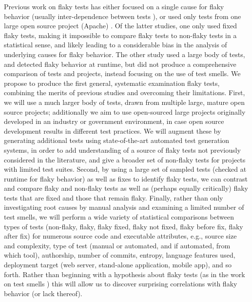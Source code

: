 \documentclass[10pt]{article}
\begin{document}
 Previous work on flaky tests has either focused on a single cause for flaky behavior (usually inter-dependence between tests \cite{LamZE2015}), or used only tests from one large open source project (Apache) \cite{luo2014empirical,palomba2017does}.  Of the latter studies, one \cite{luo2014empirical} only used fixed flaky tests, making it impossible to compare flaky tests to non-flaky tests in a statistical sense, and likely leading to a considerable bias in the analysis of underlying causes for flaky behavior.  The other study \cite{palomba2017does} used a large body of tests, and detected flaky behavior at runtime, but did not produce a comprehensive comparison of tests and projects, instead focusing on the use of test smells.  We propose to produce the first general, systematic examination flaky tests, combining the merits of previous studies and overcoming their limitations.  First, we will use a much larger body of tests, drawn from multiple large, mature open source projects; additionally we aim to use open-sourced large projects originally developed in an industry or government environment, in case open source development results in different test practices.  We will augment these by generating additional tests using state-of-the-art automated test generation systems, in order to add understanding of a source of flaky tests not previously considered in the literature, and give a broader set of non-flaky tests for projects with limited test suites.  Second, by using a large set of sampled tests (checked at runtime for flaky behavior) as well as fixes to identify flaky tests, we can contrast and compare flaky and non-flaky tests as well as (perhaps equally critically) flaky tests that are fixed and those that remain flaky.  Finally, rather than only investigating root causes by manual analysis and examining a limited number of test smells, we will perform a wide variety of statistical comparisons between types of tests (non-flaky, flaky, flaky fixed, flaky not fixed, flaky before fix, flaky after fix) for numerous source code and executable attributes, e.g., source size and complexity, type of test (manual or automated, and if automated, from which tool), authorship, number of commits, entropy, language features used, deployment target (web server, stand-alone application, mobile app), and so forth.  Rather than beginning with a hypothesis about flaky tests (as in the work on test smells \cite{palomba2017does}) this will allow us to discover surprising correlations with flaky behavior (or lack thereof).
\end{document}
